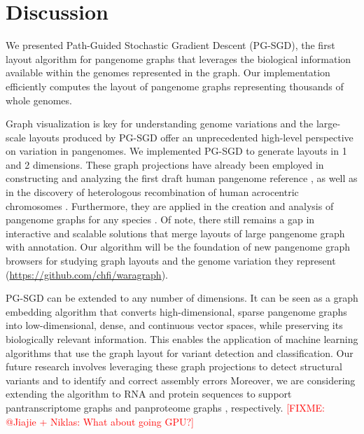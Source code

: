 \documentclass{bioinfo}
\theoremstyle{definition}
\newcommand{\red}[1]{{\textcolor{Red}{#1}}}
\newcommand{\FIXME}[1]{\red{[FIXME: #1]}}
\begin{document}
	\section{Discussion}
	\label{sec:discussion}
	
	We presented Path-Guided Stochastic Gradient Descent (PG-SGD), the first layout algorithm for pangenome graphs that leverages the biological information available within the genomes represented in the graph.
	Our implementation efficiently computes the layout of pangenome graphs representing thousands of whole genomes.
	
	Graph visualization is key for understanding genome variations and the large-scale layouts produced by PG-SGD offer an unprecedented high-level perspective on variation in pangenomes.
	We implemented PG-SGD to generate layouts in 1 and 2 dimensions.
	These graph projections have already been employed in constructing and analyzing the first draft human pangenome reference \citep{Liao2023}, as well as in the discovery of heterologous recombination of human acrocentric chromosomes \citep{Guarracino2023}.
	Furthermore, they are applied in the creation and analysis of pangenome graphs for any species \citep{Guarracino2022, Garrison2023}.
	Of note, there still remains a gap in interactive and scalable solutions that merge layouts of large pangenome graph with annotation.
	Our algorithm will be the foundation of new pangenome graph browsers for studying graph layouts and the genome variation they represent (\url{https://github.com/chfi/waragraph}).
	
	PG-SGD can be extended to any number of dimensions.
	It can be seen as a graph embedding algorithm that converts high-dimensional, sparse pangenome graphs into low-dimensional, dense, and continuous vector spaces, while preserving its biologically relevant information.
	This enables the application of machine learning algorithms that use the graph layout for variant detection and classification. 
	Our future research involves leveraging these graph projections to detect structural variants and to identify and correct assembly errors
	Moreover, we are considering extending the algorithm to RNA and protein sequences to support pantranscriptome graphs \citep{sibbesen_haplotype-aware_2023} and panproteome graphs \citep{dabbaghie_panpa:_2023}, respectively.
	\FIXME{@Jiajie + Niklas: What about going GPU?}
\end{document}
